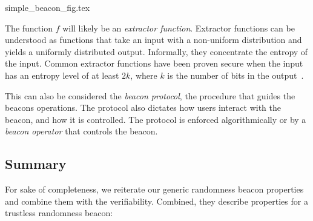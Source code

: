 {simple_beacon_fig.tex}

The function $f$ will likely be an \emph{extractor function}.
Extractor functions can be understood as functions that take an input with a non-uniform distribution and yields a uniformly distributed output.
Informally, they concentrate the entropy of the input. Common extractor functions have been proven secure when the input has an entropy level of at least $2k$, where $k$ is the number of bits in the output~\cite{dodis2004randomness}.


This can also be considered the \emph{beacon protocol}, the procedure that guides the beacons operations.
The protocol also dictates how users interact with the beacon, and how it is controlled.
The protocol is enforced algorithmically or by a \emph{beacon operator} that controls the beacon.

\subsection{Summary}

For sake of completeness, we reiterate our generic randomness beacon properties and combine them with the verifiability.
Combined, they describe properties for a trustless randomness beacon:

